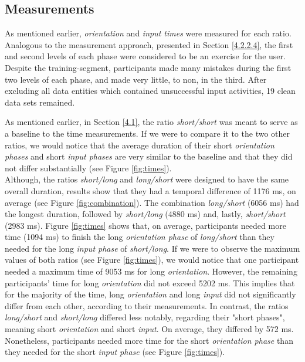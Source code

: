 \subsection{Measurements}

 As mentioned earlier, \textit{orientation} and \textit{input times} were measured for each ratio. Analogous to the measurement approach, presented in Section \ref{4.2.2.4}, the first and second levels of each phase were considered to be an exercise for the user. Despite the training-segment, participants made many mistakes during the first two levels of each phase, and made very little, to non, in the third. After excluding all data entities which contained unsuccessful input activities, 19 clean data sets remained. 

As mentioned earlier, in Section \ref{4.1}, the ratio \textit{short/short} was meant to serve as a baseline to the time measurements. If we were to compare it to the two other ratios, we would notice that the average duration of their short \textit{orientation phases} and short \textit{input phases} are very similar to the baseline and that they did not differ substantially (see Figure \ref{fig:times}).  \\

Although, the ratios \textit{short/long} and \textit{long/short} were designed to have the same overall duration, results show that they had a temporal difference of 1176 ms, on average (see Figure \ref{fig:combination}). The combination \textit{long/short} (6056 ms) had the longest duration, followed by \textit{short/long} (4880 ms) and, lastly, \textit{short/short} (2983 ms). Figure \ref{fig:times} shows that, on average, participants needed more time (1094 ms) to finish the long \textit{orientation phase} of \textit{long/short} than they needed for the long \textit{input phase} of \textit{short/long}. If we were to observe the maximum values of both ratios (see Figure \ref{fig:times}), we would notice that one participant needed a maximum time of 9053 ms for long \textit{orientation}. However, the remaining participants' time for long \textit{orientation} did not exceed 5202 ms. This implies that for the majority of the time, long \textit{orientation} and long \textit{input} did not significantly differ from each other, according to their measurements. 
In contrast, the ratios \textit{long/short} and \textit{short/long} differed less notably, regarding their "short phases", meaning short \textit{orientation} and short \textit{input}. On average, they differed by 572 ms. Nonetheless, participants needed more time for the short \textit{orientation phase} than they needed for the short \textit{input phase} (see Figure \ref{fig:times}).

